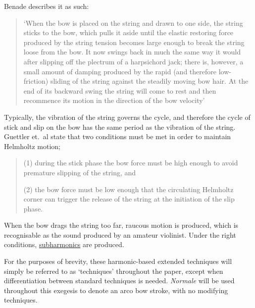 Benade describes it as such: 
\begin{quotation}
  `When the bow is placed on the string and drawn to one side, the string sticks to the bow, which pulls it aside until the elastic restoring force produced by the string tension becomes large enough to break the string loose from the bow.
  It now swings back in much the same way it would after slipping off the plectrum of a harpsichord jack; there is, however, a small amount of damping produced by the rapid (and therefore low-friction) sliding of the string against the steadily moving bow hair.
  At the end of its backward swing the string will come to rest and then recommence its motion in the direction of the bow velocity'\autocite[516]{benadeFundamentalsMusicalAcoustics1990}
\end{quotation}
Typically, the vibration of the string governs the cycle, and therefore the cycle of stick and slip on the bow has the same period as the vibration of the string.\autocite[]{wolfeBowsStrings}
Guettler et.\ al state that two conditions must be met in order to maintain Helmholtz motion;
\begin{quotation}
  (1) during the stick phase the bow force must be high enough to avoid premature slipping of the string, and 

  (2) the bow force must be low enough that the circulating Helmholtz corner can trigger the release of the string at the initiation of the slip phase.
\end{quotation}

When the bow drags the string too far, raucous motion is produced, which is recognisable as the sound produced by an amateur violinist.
Under the right conditions, \hyperref[sec:subharmonics]{subharmonics} are produced.

For the purposes of brevity, these harmonic-based extended techniques will simply be referred to as `techniques' throughout the paper, except when differentiation between standard techniques is needed.
\emph{Normale} will be used throughout this exegesis to denote an arco bow stroke, with no modifying techniques.


